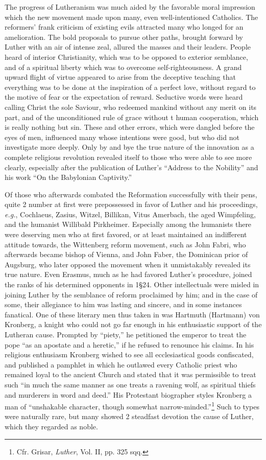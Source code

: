 The progress of Lutheranism was much aided by the favorable
moral impression which the new movement made upon many, even
well-intentioned Catholics. The reformers’ frank criticism of existing
evils attracted many who longed for an amelioration. The bold
proposals to pursue other paths, brought forward by Luther with an
air of intense zeal, allured the masses and their leaders. People heard
of interior Christianity, which was to be opposed to exterior semblance,
and of a spiritual liberty which was to overcome self-righteousness. A grand
upward flight of virtue appeared to arise from
the deceptive teaching that everything was to be done at the
inspiration of a perfect love, without regard to the motive of
fear or the expectation of reward. Seductive words were heard
calling Christ the sole Saviour, who redeemed mankind without any
merit on its part, and of the unconditioned rule of grace without
t human cooperation, which is really nothing but sin. These
and other errors, which were dangled before the eyes of men, influenced many whose
intentions were good, but who did not investigate more deeply. Only
by and bye the true nature of the innovation as a complete religious
revolution revealed itself to those who were able to see more clearly,
especially after the publication of Luther’s “Address to the Nobility”
and his work “On the Babylonian Captivity.”

Of those who afterwards combated the Reformation successfully
with their pens, quite 2 number at first were prepossessed in favor of
Luther and his proceedings, \textit{e.g.}, Cochlaeus, Zasius, Witzel, Billikan,
Vitus Amerbach, the aged Wimpfeling, and the humanist Willibald
Pirkheimer. Especially among the humanists there were deserving
men who at first favored, or at least maintained an indifferent attitude
towards, the Wittenberg reform movement, such as John Fabri,
who afterwards became bishop of Vienna, and John Faber, the Dominican prior
of Augsburg, who later opposed the movement when
it unmistakably revealed its true nature. Even Erasmus, much as he
had favored Luther’s procedure, joined the ranks of his determined
opponents in 1§24. Other intellectuals were misled in joining Luther
by the semblance of reform proclaimed by him; and in the case of
some, their allegiance to him was lasting and sincere, and in some instances
fanatical. One of these literary men thus taken in was
Hartmuth (Hartmann) von Kronberg, a knight who could not go far
enough in his enthusiastic support of the Lutheran cause. Prompted
by “piety,” he petitioned the emperor to treat the pope “as an apostate
and a heretic,” if he refused to renounce his claims. In his religious
enthusiasm Kronberg wished to see all ecclesiastical goods
confiscated, and published a pamphlet in which he outlawed every
Catholic priest who remained loyal to the ancient Church and stated
that it was permissible to treat such “in much the same manner
as one treats a ravening wolf, as spiritual thiefs and murderers in
word and deed.” His Protestant biographer styles Kronberg a man of
“unshakable character, though somewhat narrow-minded.”\footnote
{Cfr. Grisar, \textit{Luther}, Vol. II, pp. 325 sqq.}
Such to types were naturally rare, but many showed 2 steadfast devotion
the cause of Luther, which they regarded as noble.

